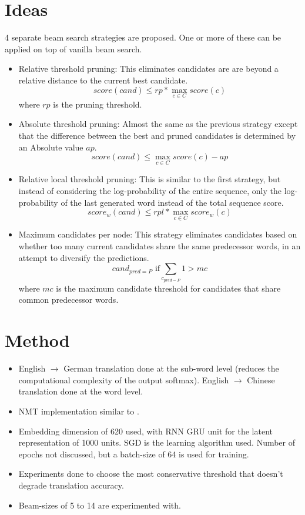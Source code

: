 \documentclass[12pt]{scrartcl}
\begin{document}
\section{Ideas}
  4 separate beam search strategies are proposed. One or more of these can be applied on top of vanilla beam search.
  \begin{itemize}
    \item Relative threshold pruning: This eliminates candidates are are beyond a relative distance to the current best candidate.
    $$score(cand) \leq rp * \max_{c \in C} {score(c)}$$
    where $rp$ is the pruning threshold.
    \item Absolute threshold pruning: Almost the same as the previous strategy except that the difference between the best and pruned candidates is determined by an Absolute value $ap$.
    $$score(cand) \leq \max_{c \in C} {score(c)} - ap$$
    \item Relative local threshold pruning: This is similar to the first strategy, but instead of considering the log-probability of the entire sequence, only the log-probability of the last generated word instead of the total sequence score.
    $$score_w(cand) \leq rpl * \max_{c \in C} {score_w(c)}$$
    \item Maximum candidates per node: This strategy eliminates candidates based on whether too many current candidates share the same predecessor words, in an attempt to diversify the predictions.
    $$cand_{pred = P} \text{ if} \sum_{c_{pred = P}} 1 > mc$$
    where $mc$ is the maximum candidate threshold for candidates that share common predecessor words.
  \end{itemize}

\section{Method}
  \begin{itemize}
    \item English $\rightarrow$ German translation done at the sub-word level (reduces the computational complexity of the output softmax). English $\rightarrow$ Chinese translation done at the word level.
    \item NMT implementation similar to \cite{bahdanau2014neural}.
    \item Embedding dimension of 620 used, with RNN GRU unit for the latent representation of 1000 units. SGD is the learning algorithm used. Number of epochs not discussed, but a batch-size of 64 is used for training.
    \item Experiments done to choose the most conservative threshold that doesn't degrade translation accuracy. 
    \item Beam-sizes of 5 to 14 are experimented with.
  \end{itemize}
\end{document}
